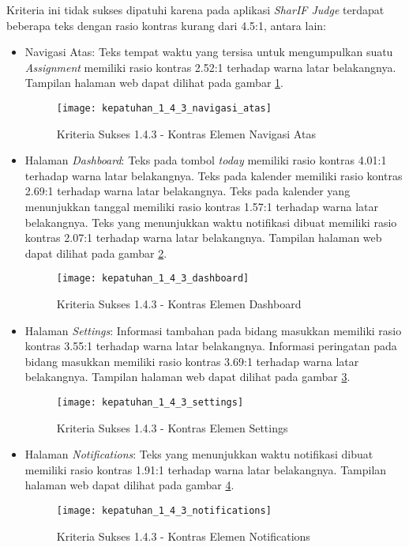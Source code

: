 Kriteria ini tidak sukses dipatuhi karena pada aplikasi \textit{SharIF Judge} terdapat beberapa teks dengan rasio kontras kurang dari 4.5:1, antara lain:
\begin{itemize}
	\item Navigasi Atas: Teks tempat waktu yang tersisa untuk mengumpulkan suatu \textit{Assignment} memiliki rasio kontras 2.52:1 terhadap warna latar belakangnya. Tampilan halaman web dapat dilihat pada gambar \ref{fig:kepatuhan_1_4_3_navigasi_atas}.
	\begin{figure}[H]
		\centering  
		\texttt{[image: kepatuhan\_1\_4\_3\_navigasi\_atas]}  
		\caption[Kriteria Sukses 1.4.3 - Kontras Elemen Navigasi Atas]{Kriteria Sukses 1.4.3 - Kontras Elemen Navigasi Atas} 
		\label{fig:kepatuhan_1_4_3_navigasi_atas} 
	\end{figure}

	\item Halaman \textit{Dashboard}: Teks pada tombol \textit{today} memiliki rasio kontras 4.01:1 terhadap warna latar belakangnya. Teks pada kalender memiliki rasio kontras 2.69:1 terhadap warna latar belakangnya. Teks pada kalender yang menunjukkan tanggal memiliki rasio kontras 1.57:1 terhadap warna latar belakangnya. Teks yang menunjukkan waktu notifikasi dibuat memiliki rasio kontras 2.07:1 terhadap warna latar belakangnya. Tampilan halaman web dapat dilihat pada gambar \ref{fig:kepatuhan_1_4_3_dashboard}.
	\begin{figure}[H]
		\centering  
		\texttt{[image: kepatuhan\_1\_4\_3\_dashboard]}  
		\caption[Kriteria Sukses 1.4.3 - Kontras Elemen Dashboard]{Kriteria Sukses 1.4.3 - Kontras Elemen Dashboard} 
		\label{fig:kepatuhan_1_4_3_dashboard} 
	\end{figure}

	\item Halaman \textit{Settings}: Informasi tambahan pada bidang masukkan memiliki rasio kontras 3.55:1 terhadap warna latar belakangnya. Informasi peringatan pada bidang masukkan memiliki rasio kontras 3.69:1 terhadap warna latar belakangnya. Tampilan halaman web dapat dilihat pada gambar \ref{fig:kepatuhan_1_4_3_settings}.
	\begin{figure}[H]
		\centering  
		\texttt{[image: kepatuhan\_1\_4\_3\_settings]}  
		\caption[Kriteria Sukses 1.4.3 - Kontras Elemen Settings]{Kriteria Sukses 1.4.3 - Kontras Elemen Settings} 
		\label{fig:kepatuhan_1_4_3_settings} 
	\end{figure}

	\item Halaman \textit{Notifications}: Teks yang menunjukkan waktu notifikasi dibuat memiliki rasio kontras 1.91:1 terhadap warna latar belakangnya. Tampilan halaman web dapat dilihat pada gambar \ref{fig:kepatuhan_1_4_3_notifications}.
	\begin{figure}[H]
		\centering  
		\texttt{[image: kepatuhan\_1\_4\_3\_notifications]}  
		\caption[Kriteria Sukses 1.4.3 - Kontras Elemen Notifications]{Kriteria Sukses 1.4.3 - Kontras Elemen Notifications} 
		\label{fig:kepatuhan_1_4_3_notifications} 
	\end{figure}
	

\end{itemize}
